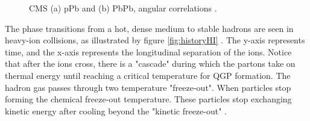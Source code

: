 \begin{figure}%
    \centering
    \qquad
    \caption{CMS (a) pPb and (b) PbPb, angular correlations \cite{Chatrchyan:2013nka}.}%
    \label{fig:exampleRidge}%
\end{figure}

The phase transitions from a hot, dense medium to stable hadrons are seen in heavy-ion collisions, as illustrated by figure \ref{fig:historyHI} \cite{Wang:2012jua}. The y-axis represents time, and the x-axis represents the longitudinal separation of the ions. Notice that after the ions cross, there is a "cascade" during which the partons take on thermal energy until reaching a critical temperature for QGP formation. The hadron gas passes through two temperature "freeze-out". When particles stop forming the chemical freeze-out temperature. These particles stop exchanging kinetic energy after cooling beyond the "kinetic freeze-out" \cite{bjEdense}.

